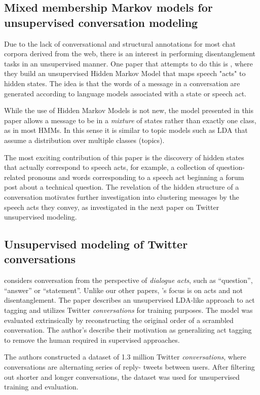 \documentclass{article}
\begin{document}
\subsection{Mixed membership Markov models for unsupervised conversation
modeling} Due to the lack of conversational and structural annotations for
most chat corpora derived from the web, there is an interest in performing
disentanglement tasks in an unsupervised manner. One paper that attempts to do
this is \cite{Paul2012}, where they build an unsupervised Hidden Markov Model
that maps speech "acts" to hidden states. The idea is that the words of a
message in a conversation are generated according to language models
associated with a state or speech act.

While the use of Hidden Markov Models is not new, the model presented in this
paper allows a message to be in a \emph{mixture} of states rather than exactly
one class, as in most HMMs. In this sense it is similar to topic models such
as LDA that assume a distribution over multiple classes (topics).

The most exciting contribution of this paper is the discovery of hidden states
that actually correspond to speech acts, for example, a collection of
question-related pronouns and words corresponding to a speech act beginning a
forum post about a technical question. The revelation of the hidden structure
of a conversation motivates further investigation into clustering messages by
the speech acts they convey, as investigated in the next paper on Twitter
unsupervised modeling.

\subsection{Unsupervised modeling of Twitter conversations}
\cite{Ritter2010a} considers conversation from the perspective of
\textit{dialogue acts}, such as ``question'', ``answer'' or ``statement''. Unlike our other papers,
\cite{Ritter2010a}'s focus is on acts and not disentanglement. The paper describes
an unsupervised LDA-like approach to act tagging and utilizes Twitter
\textit{conversations} for training purposes. The model was evaluated
extrinsically by reconstructing the original order of a scrambled
conversation. The author's describe their motivation as generalizing act
tagging to remove the human required in supervised approaches.

The authors constructed a dataset of 1.3 million Twitter
\textit{conversations}, where conversations are alternating series of reply-
tweets between users. After filtering out shorter and longer conversations,
the dataset was used for unsupervised training and evaluation.
\end{document}
